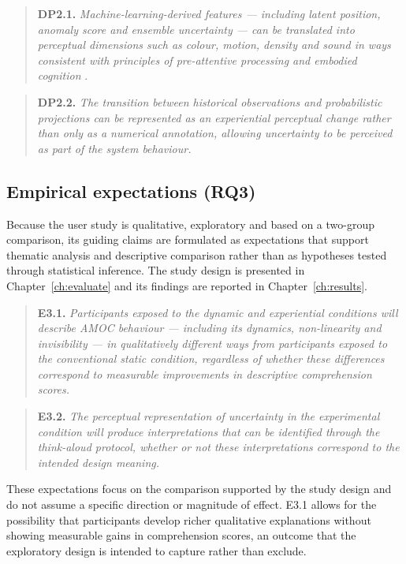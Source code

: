 \begin{quote}
\textbf{DP2.1.} \emph{Machine-learning-derived features --- including latent position, anomaly score and ensemble uncertainty --- can be translated into perceptual dimensions such as colour, motion, density and sound in ways consistent with principles of pre-attentive processing and embodied cognition} \citep{ware2021, lakoff1999}.
\end{quote}

\begin{quote}
\textbf{DP2.2.} \emph{The transition between historical observations and probabilistic projections can be represented as an experiential perceptual change rather than only as a numerical annotation, allowing uncertainty to be perceived as part of the system behaviour.}
\end{quote}

\subsection*{Empirical expectations (RQ3)}

Because the user study is qualitative, exploratory and based on a two-group comparison, its guiding claims are formulated as expectations that support thematic analysis and descriptive comparison rather than as hypotheses tested through statistical inference. The study design is presented in Chapter~\ref{ch:evaluate} and its findings are reported in Chapter~\ref{ch:results}.

\begin{quote}
\textbf{E3.1.} \emph{Participants exposed to the dynamic and experiential conditions will describe AMOC behaviour --- including its dynamics, non-linearity and invisibility --- in qualitatively different ways from participants exposed to the conventional static condition, regardless of whether these differences correspond to measurable improvements in descriptive comprehension scores.}
\end{quote}

\begin{quote}
\textbf{E3.2.} \emph{The perceptual representation of uncertainty in the experimental condition will produce interpretations that can be identified through the think-aloud protocol, whether or not these interpretations correspond to the intended design meaning.}
\end{quote}

\noindent These expectations focus on the comparison supported by the study design and do not assume a specific direction or magnitude of effect. E3.1 allows for the possibility that participants develop richer qualitative explanations without showing measurable gains in comprehension scores, an outcome that the exploratory design is intended to capture rather than exclude.

